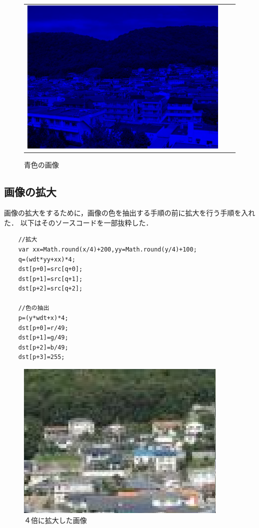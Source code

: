\documentclass[11pt]{jarticle}
\begin{document}
\begin{figure}[htbp]
\begin{tabular}{ccc}
\begin{minipage}{0.33\hsize}
\begin{center}
                \includegraphics[scale=.3]{1-4-2.png}
                \caption{青色の画像}
            \end{center}
        \end{minipage}
    \end{tabular}
\end{figure}

\subsection{画像の拡大}
画像の拡大をするために，画像の色を抽出する手順の前に拡大を行う手順を入れた．
以下はそのソースコードを一部抜粋した．

\begin{verbatim}
    //拡大
    var xx=Math.round(x/4)+200,yy=Math.round(y/4)+100;
    q=(wdt*yy+xx)*4;
    dst[p+0]=src[q+0];
    dst[p+1]=src[q+1];
    dst[p+2]=src[q+2];

    //色の抽出
    p=(y*wdt+x)*4;
    dst[p+0]=r/49;
    dst[p+1]=g/49;
    dst[p+2]=b/49;
    dst[p+3]=255;
\end{verbatim}
\begin{figure}[h]
    \centering
    \includegraphics[scale=.3]{1-4-3.png}
    \caption{４倍に拡大した画像}
\end{figure}
\end{document}
